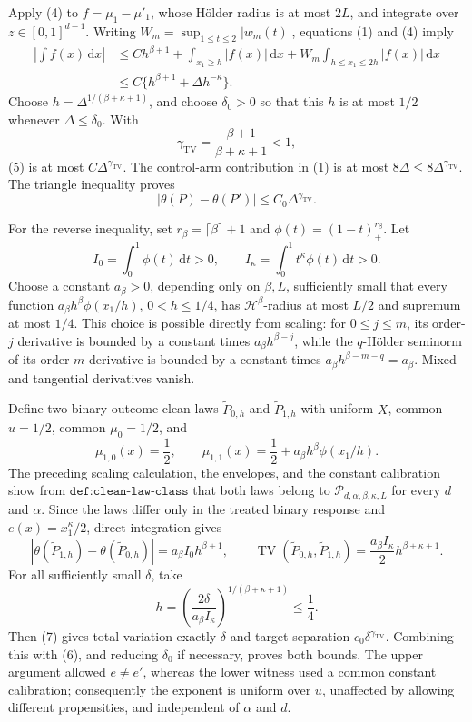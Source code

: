 Apply (4) to \(f=\mu_1-\mu'_1\), whose Hölder radius is at most \(2L\), and integrate over \(z\in[0,1]^{d-1}\).  Writing \(W_m=\sup_{1\leq t\leq2}|w_m(t)|\), equations (1) and (4) imply
\[
 \begin{aligned}
 \left|\int f(x)\,\mathrm dx\right|
 &\leq C h^{\beta+1}+\int_{x_1\geq h}|f(x)|\,\mathrm dx
      +W_m\int_{h\leq x_1\leq2h}|f(x)|\,\mathrm dx\\
 &\leq C\{h^{\beta+1}+\Delta h^{-\kappa}\}.
 \end{aligned}\tag{5}
\]
Choose \(h=\Delta^{1/(\beta+\kappa+1)}\), and choose \(\delta_0>0\) so that this \(h\) is at most \(1/2\) whenever \(\Delta\leq\delta_0\).  With
\[
 \gamma_{\mathrm{TV}}=\frac{\beta+1}{\beta+\kappa+1}<1,
\]
(5) is at most \(C\Delta^{\gamma_{\mathrm{TV}}}\).  The control-arm contribution in (1) is at most \(8\Delta\leq8\Delta^{\gamma_{\mathrm{TV}}}\).  The triangle inequality proves
\[
 |\theta(P)-\theta(P')|\leq C_0\Delta^{\gamma_{\mathrm{TV}}}. \tag{6}
\]

For the reverse inequality, set \(r_\beta=\lceil\beta\rceil+1\) and \(\phi(t)=(1-t)_+^{r_\beta}\).  Let
\[
 I_0=\int_0^1\phi(t)\,\mathrm dt>0,\qquad
 I_\kappa=\int_0^1t^\kappa\phi(t)\,\mathrm dt>0.
\]
Choose a constant \(a_\beta>0\), depending only on \(\beta,L\), sufficiently small that every function \(a_\beta h^\beta\phi(x_1/h)\), \(0<h\leq1/4\), has \(\mathcal H^\beta\)-radius at most \(L/2\) and supremum at most \(1/4\).  This choice is possible directly from scaling: for \(0\leq j\leq m\), its order-\(j\) derivative is bounded by a constant times \(a_\beta h^{\beta-j}\), while the \(q\)-Hölder seminorm of its order-\(m\) derivative is bounded by a constant times \(a_\beta h^{\beta-m-q}=a_\beta\).  Mixed and tangential derivatives vanish.

Define two binary-outcome clean laws \(\widetilde P_{0,h}\) and \(\widetilde P_{1,h}\) with uniform \(X\), common \(u=1/2\), common \(\mu_0=1/2\), and
\[
 \mu_{1,0}(x)=\frac12,\qquad
 \mu_{1,1}(x)=\frac12+a_\beta h^\beta\phi(x_1/h).
\]
The preceding scaling calculation, the envelopes, and the constant calibration show from \(\texttt{def:clean-law-class}\) that both laws belong to \(\mathcal P_{d,\alpha,\beta,\kappa,L}\) for every \(d\) and \(\alpha\).  Since the laws differ only in the treated binary response and \(e(x)=x_1^\kappa/2\), direct integration gives
\[
 |\theta(\widetilde P_{1,h})-\theta(\widetilde P_{0,h})|=a_\beta I_0h^{\beta+1},\qquad
 \operatorname{TV}(\widetilde P_{0,h},\widetilde P_{1,h})=\frac{a_\beta I_\kappa}{2}h^{\beta+\kappa+1}. \tag{7}
\]
For all sufficiently small \(\delta\), take
\[
 h=\left(\frac{2\delta}{a_\beta I_\kappa}\right)^{1/(\beta+\kappa+1)}\leq\frac14.
\]
Then (7) gives total variation exactly \(\delta\) and target separation \(c_0\delta^{\gamma_{\mathrm{TV}}}\).  Combining this with (6), and reducing \(\delta_0\) if necessary, proves both bounds.  The upper argument allowed \(e\neq e'\), whereas the lower witness used a common constant calibration; consequently the exponent is uniform over \(u\), unaffected by allowing different propensities, and independent of \(\alpha\) and \(d\).


